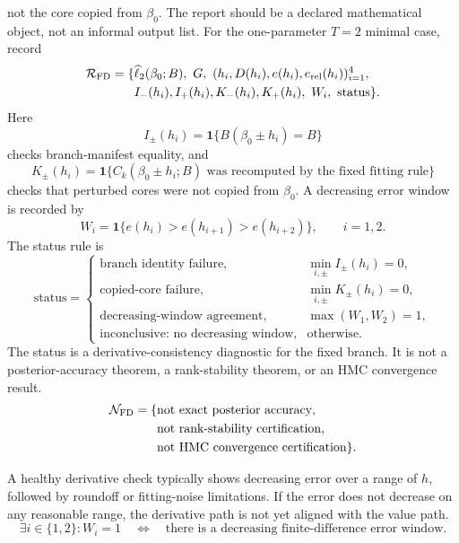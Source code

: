 \documentclass[11pt]{article}
\newcommand{\ind}{\mathbf 1}
\newcommand{\widehatell}{\widehat\ell}
\begin{document}
not the core copied from \(\beta_0\).
The report should be a declared mathematical object, not an informal output
list.
For the one-parameter \(T=2\) minimal case, record
\[
\begin{aligned}
    \mathcal R_{\rm FD}
    =
    \{&
    \widehatell_2(\beta_0;B),\
    G,\
    (h_i,D(h_i),e(h_i),e_{\rm rel}(h_i))_{i=1}^{4},\\
    &I_-(h_i),I_+(h_i),K_-(h_i),K_+(h_i),\
    W_i,\ \text{status}\}.
\end{aligned}
\label{eq:p24-p22-fd1}
\]
Here
\[
    I_\pm(h_i)
    =
    \ind\{B(\beta_0\pm h_i)=B\}
    \label{eq:p24-p22-fd2}
\]
checks branch-manifest equality, and
\[
    K_\pm(h_i)
    =
    \ind\{C_k(\beta_0\pm h_i;B)
    \text{ was recomputed by the fixed fitting rule}\}
    \label{eq:p24-p22-fd3}
\]
checks that perturbed cores were not copied from \(\beta_0\).  A decreasing
error window is recorded by
\[
    W_i=\ind\{e(h_i)>e(h_{i+1})>e(h_{i+2})\},
    \qquad i=1,2.
    \label{eq:p24-p22-fd4}
\]
The status rule is
\[
\text{status}
=
\begin{cases}
\text{branch identity failure},&
    \min_{i,\pm} I_\pm(h_i)=0,\\
\text{copied-core failure},&
    \min_{i,\pm} K_\pm(h_i)=0,\\
\text{decreasing-window agreement},&
    \max(W_1,W_2)=1,\\
\text{inconclusive: no decreasing window},&
    \text{otherwise}.
\end{cases}
\label{eq:p24-p22-fd5}
\]
The status is a derivative-consistency diagnostic for the fixed branch.  It is
not a posterior-accuracy theorem, a rank-stability theorem, or an HMC
convergence result.
\[
    \begin{aligned}
    \mathcal N_{\rm FD}
    =
    \{&
    \text{not exact posterior accuracy},\\
    &\text{not rank-stability certification},\\
    &\text{not HMC convergence certification}\}.
    \end{aligned}
    \label{eq:p24-p22-fd7}
\]

A healthy derivative check typically shows decreasing error over a range of
\(h\), followed by roundoff or fitting-noise limitations.  If the error does
not decrease on any reasonable range, the derivative path is not yet aligned
with the value path.
\[
    \exists i\in\{1,2\}: W_i=1
    \quad\Longleftrightarrow\quad
    \text{there is a decreasing finite-difference error window.}
    \label{eq:p24-p22-fd8}
\]
\end{document}
